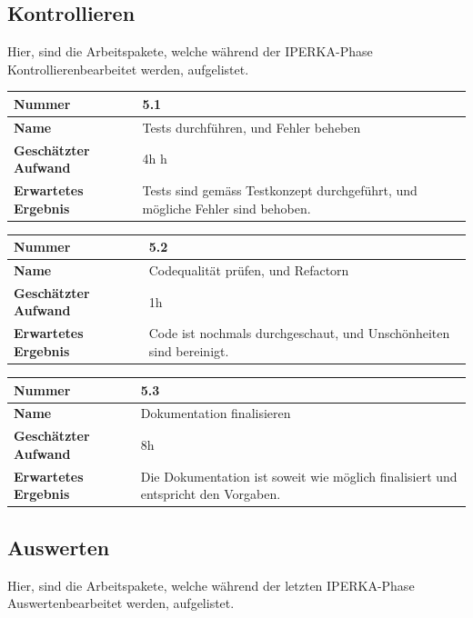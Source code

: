 \subsection{Kontrollieren}
Hier, sind die Arbeitspakete, welche während der IPERKA-Phase \flqq Kontrollieren\frqq{}\space bearbeitet werden, aufgelistet.

\begin{longtable}{p{}|p{}}
	\hline
	\textbf{Nummer}    				& 5.1 \\
	\hline
	\textbf{Name}   				& Tests durchführen, und Fehler beheben \\
	\hline
	\textbf{Geschätzter Aufwand}	& 4h
	h \\
	\hline
	\textbf{Erwartetes Ergebnis}	& Tests sind gemäss Testkonzept durchgeführt, und mögliche Fehler sind behoben. \\
	\hline
\end{longtable}

\begin{longtable}{p{}|p{}}
	\hline
	\textbf{Nummer}    				& 5.2 \\
	\hline
	\textbf{Name}   				& Codequalität prüfen, und Refactorn \\
	\hline
	\textbf{Geschätzter Aufwand}	& 1h \\
	\hline
	\textbf{Erwartetes Ergebnis}	& Code ist nochmals durchgeschaut, und Unschönheiten sind bereinigt.\\
	\hline
\end{longtable}

\begin{longtable}{p{}|p{}}
	\hline
	\textbf{Nummer}    				& 5.3 \\
	\hline
	\textbf{Name}   				& Dokumentation finalisieren \\
	\hline
	\textbf{Geschätzter Aufwand}	& 8h \\
	\hline
	\textbf{Erwartetes Ergebnis}	& Die Dokumentation ist soweit wie möglich finalisiert und entspricht den Vorgaben.\\
	\hline
\end{longtable}

\subsection{Auswerten}
Hier, sind die Arbeitspakete, welche während der letzten IPERKA-Phase \flqq Auswerten\frqq{}\space bearbeitet werden, aufgelistet.

